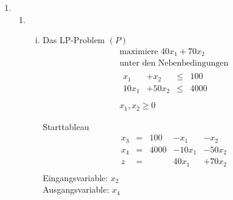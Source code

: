 \documentclass[a4paper]{scrartcl}
\begin{document}
\begin{enumerate}[label=\bfseries\arabic*.]
\begin{enumerate}
        \end{enumerate}

    \item %
        \begin{enumerate}
            \item
                \begin{enumerate}[(i)]
                    \item Das LP-Problem $(P)$
                        \begin{equation}
                            \begin{gathered}
                                \text{maximiere }
                                40x_1 +70x_2 \\
                                \text{unter den Nebenbedingungen} \\
                                \begin{array}{rrcr}
                                    x_1 & +x_2 & \leq & 100 \\
                                    10x_1 & +50x_2 & \leq & 4000 \\
                                \end{array} \\
                                x_1, x_2 \geq 0
                            \end{gathered}
                        \end{equation}

                        Starttableau
                        \begin{equation}
                            \begin{array}{rcrrr}
                                x_3 & = & 100 & -x_1 & -x_2 \\
                                x_4 & = & 4000 & -10x_1 & -50x_2 \\
                                \hline
                                z & = & & 40x_1 & +70x_2 \\
                            \end{array}
                        \end{equation}
                        Eingangsvariable: $x_2$ \\
                        Ausgangsvariable: $x_4$


\end{enumerate}
\end{enumerate}
\end{enumerate}
\end{document}
